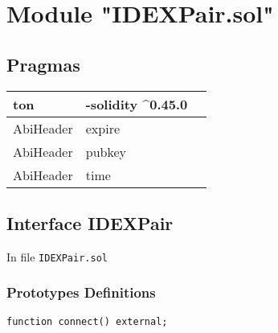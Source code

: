 
\section{Module "IDEXPair.sol"}


\subsection{Pragmas}


\noindent\begin{tabular}{|l|l|p{5cm}|}\hline
ton & -solidity \^{}0.45.0 &\\\hline
AbiHeader &  expire &\\\hline
AbiHeader &  pubkey &\\\hline
AbiHeader &  time &\\\hline
\end{tabular}


\subsection{Interface IDEXPair}


In file {\tt IDEXPair.sol}

\subsubsection{Prototypes Definitions}

\vspace{2cm}

\begin{lstlisting}[firstnumber=7]
  function connect() external;
\end{lstlisting}
